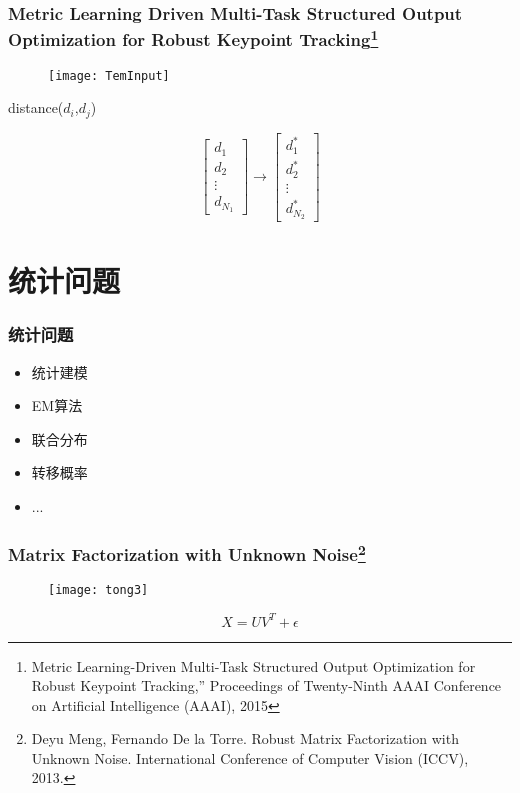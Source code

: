 \documentclass[notheorems,mathserif,table,compress]{beamer}  %
\begin{document}
\begin{frame}
\frametitle{Metric Learning Driven Multi-Task Structured Output Optimization for Robust Keypoint Tracking\footnote{Metric Learning-Driven Multi-Task Structured Output Optimization for Robust Keypoint Tracking,” Proceedings of Twenty-Ninth AAAI Conference on Artificial Intelligence (AAAI), 2015}}
\begin{figure}
\texttt{[image: TemInput]}
\end{figure}
\begin{center}
distance($d_i$,$d_j$)
\end{center}
\begin{equation}
\left[ 
\begin{array}{c}
d_1\\
d_2\\
\vdots\\
d_{N_1}
\end{array}
\right]
\longrightarrow
\left[ 
\begin{array}{c}
d^*_1\\
d^*_2\\
\vdots\\
d^*_{N_2}
\end{array}
\right]
\end{equation}
\end{frame}

\section{统计问题}
\begin{frame}
\frametitle{统计问题}
\begin{itemize}
\item 统计建模
\item EM算法
\item 联合分布
\item 转移概率
\item ...
\end{itemize}
\end{frame}

\begin{frame}
\frametitle{Matrix Factorization with Unknown Noise\footnote{Deyu Meng, Fernando De la Torre. Robust Matrix Factorization with Unknown Noise. International Conference of Computer Vision (ICCV), 2013.}}

\begin{figure}
\texttt{[image: tong3]}
\end{figure}
\begin{equation}
X=UV^T+\epsilon
\end{equation}
\end{frame}
\end{document}
